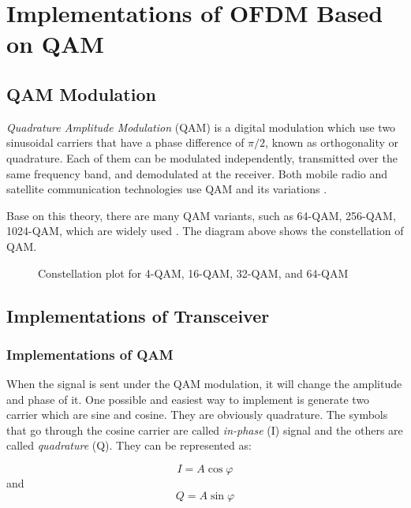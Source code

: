\documentclass[11pt]{article}
\numberwithin{figure}{section}
\numberwithin{equation}{section}
\begin{document}
\section{Implementations of OFDM Based on QAM}

\subsection{QAM Modulation}
\textit{Quadrature Amplitude Modulation} (QAM) is a digital modulation which use two sinusoidal carriers that have a phase difference of $\pi/2$, known as orthogonality or quadrature. Each of them can be modulated independently, transmitted over the same frequency band, and demodulated at the receiver. Both mobile radio and satellite communication technologies use QAM and its variations \cite{RN77}.

Base on this theory, there are many QAM variants, such as 64-QAM, 256-QAM, 1024-QAM, which are widely used \cite{RN77}. The diagram above shows the constellation of QAM.

\begin{figure}[!h]
    \centering
    
    \caption{Constellation plot for 4-QAM, 16-QAM, 32-QAM, and 64-QAM}
    \label{fig:Constellation of QAM}
\end{figure}

\subsection{Implementations of Transceiver}
\subsubsection{Implementations of QAM}
When the signal is sent under the QAM modulation, it will change the amplitude and phase of it. One possible and easiest way to implement is generate two carrier which are sine and cosine. They are obviously quadrature. The symbols that go through the cosine carrier are called \textit{in-phase} (I) signal and the others are called \textit{quadrature} (Q). They can be represented as: 

\begin{equation}
I = A\cos{\varphi} \label{con:i signal}
\end{equation}
and
\begin{equation}
Q = A\sin{\varphi} \label{con:q signal}
\end{equation}
\end{document}
